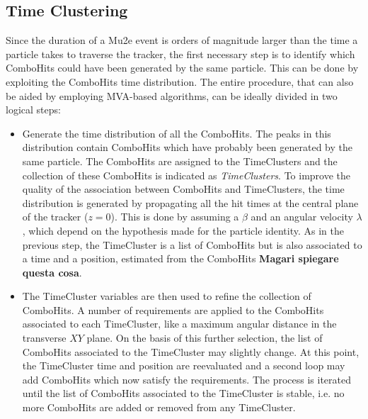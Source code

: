 \documentclass[12pt,a4paper,openright, oneside, titlepage]{book} %
\begin{document}
\subsection{Time Clustering} 
Since the duration of a Mu2e event is orders of magnitude larger than the time 
a particle takes to traverse the tracker, the first necessary step is to identify which ComboHits 
could have been generated by the same particle. 
This can be done by exploiting the ComboHits  time distribution.
The entire procedure, that can also be aided by employing MVA-based algorithms, 
can be ideally divided in two logical steps:
\begin{itemize}
\item Generate the time distribution of all the ComboHits. 
The peaks in this distribution contain ComboHits which have probably been generated by the same particle. 
The ComboHits are assigned to the TimeClusters and the collection of these ComboHits is indicated as \textit{TimeClusters}.
To improve the quality of the association between ComboHits and TimeClusters, 
the time distribution is generated by propagating all the hit times at the central plane of the tracker ($z=0$). 
This is done by assuming a $\beta$ and an angular velocity $\lambda$, 
which depend on the hypothesis made for the particle identity.
As in the previous step, the TimeCluster is a list of ComboHits but is also associated to a time and a position, 
estimated from the ComboHits {\bf{Magari spiegare questa cosa}}.
\item  The TimeCluster variables are then used to refine the collection of ComboHits.
A number of requirements are applied to the ComboHits associated to each TimeCluster, 
like a maximum angular distance in the transverse $XY$ plane. On the basis of this
further selection, the list of ComboHits associated to the TimeCluster may slightly change. 
At this point, the TimeCluster time and position are reevaluated 
and a second loop may add ComboHits which now satisfy the requirements. 
The process is iterated until the list of ComboHits associated to the TimeCluster is stable,
i.e. no more ComboHits are added or removed from any TimeCluster.
\end{itemize}
\end{document}
